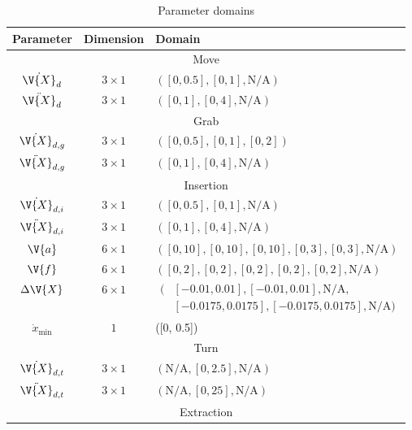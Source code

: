 \renewcommand{\arraystretch}{1.2}
\begin{table*}[ht!]
    \centering
    \caption{Parameter domains}
    \label{tab:experiments:comparison:parameters}
    \begin{tabular}{|c|c|l|}
    \hline
    Parameter & Dimension & Domain \\
    \hline
    \multicolumn{3}{|c|}{Move} \\
    \hline
     $\dot{\V{X}}_{d}$  & $3 \times 1$ & $([0, 0.5], [0, 1], \text{N/A})$  \\
         \hline
         $\ddot{\V{X}}_{d}$ & $3 \times 1$ & $([0, 1], [0, 4], \text{N/A})$\\
         \hline
    \multicolumn{3}{|c|}{Grab} \\
    \hline
       $\dot{\V{X}}_{d,g}$  & $3 \times 1$ & $([0, 0.5], [0, 1], [0, 2])$  \\
         \hline
         $\ddot{\V{X}}_{d,g}$ & $3 \times 1$ & $([0, 1], [0, 4], \text{N/A})$\\
         \hline
    \multicolumn{3}{|c|}{Insertion} \\
    \hline
           $\dot{\V{X}}_{d,i}$  & $3 \times 1$ & $([0, 0.5], [0, 1], \text{N/A})$  \\
         \hline
         $\ddot{\V{X}}_{d,i}$ & $3 \times 1$ & $([0, 1], [0, 4], \text{N/A})$\\
         \hline
         $\V{a}$ & $6 \times 1$ & $([0,10],[0,10],[0,10],[0,3],[0,3],\text{N/A})$\\
         \hline
         $\V{f}$ & $6 \times 1$ & $([0,2],[0,2],[0,2],[0,2],[0, 2],\text{N/A})$\\
         \hline
         $\Delta \V{X}$ & $6 \times 1$ & $\begin{aligned}(&[-0.01,0.01],[-0.01,0.01],\text{N/A},\\
         &[-0.0175,0.0175],[-0.0175,0.0175],\text{N/A})\end{aligned}$\\
         \hline
         $\dot{x}_\text{min}$ & $1$ & ([0, 0.5])\\
         \hline
          \multicolumn{3}{|c|}{Turn} \\
          \hline
                 $\dot{\V{X}}_{d,t}$  & $3 \times 1$ & $(\text{N/A}, [0, 2.5], \text{N/A})$  \\
         \hline
         $\ddot{\V{X}}_{d,t}$ & $3 \times 1$ & $(\text{N/A}, [0, 25], \text{N/A})$\\
         \hline
    \multicolumn{3}{|c|}{Extraction} \\

\end{tabular}
\end{table*}
